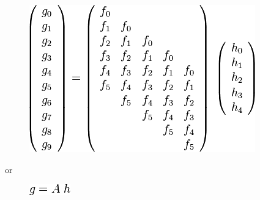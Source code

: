 \begin{figure}[H]
\centering
\includegraphics[scale=.6]{graphics/5cec990b9d6c1fdc3b340a364729aea6.png}
\end{figure}

or

\begin{figure}[H]
\centering
\includegraphics[scale=.6]{graphics/9321b2aa2a198225b0dbe56040b49940.png}
\end{figure}


